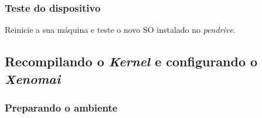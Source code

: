 \documentclass[a4paper,10pt]{article}
\begin{document}
    \subsubsection{Teste do dispositivo}
      Reinicie a sua máquina e teste o novo SO instalado no \emph{pendrive}.
  \subsection{Recompilando o \emph{Kernel} e configurando o \emph{Xenomai}}
    \subsubsection{Preparando o ambiente}
\end{document}
